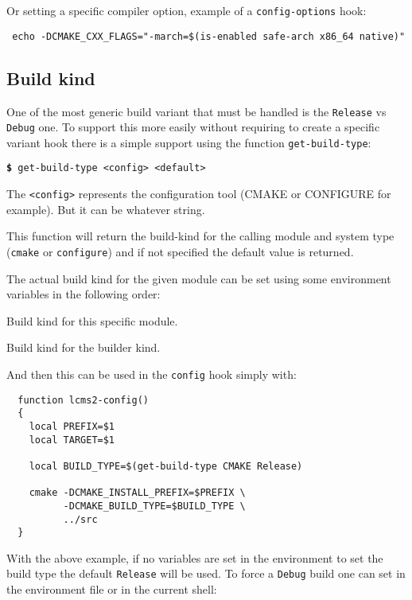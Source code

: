 \documentclass[a4paper,12pt,twoside]{article}
\newcommand{\code}[1]{\texttt{#1}}
\newcommand{\cmd}[1]{\tabto{1cm}\hspace{0.5cm}\texttt{\textbf{\$} #1}}
\begin{document}
Or setting a specific compiler option, example of a \code{config-options} hook:

\begin{lstlisting}
 echo -DCMAKE_CXX_FLAGS="-march=$(is-enabled safe-arch x86_64 native)"
\end{lstlisting}

\subsection{Build kind}
 

One of the most generic build variant that must be handled is the \code{Release} vs \code{Debug} one. To support this more easily without requiring to create a specific variant hook there is a simple support using the function \code{get-build-type}:

\cmd{get-build-type <config> <default>}

The \code{<config>} represents the configuration tool (CMAKE or CONFIGURE for example). But it can be whatever string.

This function will return the build-kind for the calling module and system type (\code{cmake} or \code{configure}) and if not specified the default value is returned.

The actual build kind for the given module can be set using some environment variables in the following order:

\begin{description}[style=nextline]
	\item [SCBI\_<module>\_BUILD\_TYPE] Build kind for this specific module.
	\item [SCBI\_<CONFIG>\_BUILD\_TYPE] Build kind for the builder kind.
\end{description}

And then this can be used in the \code{config} hook simply with:

\begin{lstlisting}
  function lcms2-config()
  {
    local PREFIX=$1
    local TARGET=$1

    local BUILD_TYPE=$(get-build-type CMAKE Release)

    cmake -DCMAKE_INSTALL_PREFIX=$PREFIX \
          -DCMAKE_BUILD_TYPE=$BUILD_TYPE \
          ../src
  }
\end{lstlisting}

With the above example, if no variables are set in the environment to set the build type the default \code{Release} will be used. To force a \code{Debug} build one can set in the environment file or in the current shell:
\end{document}
